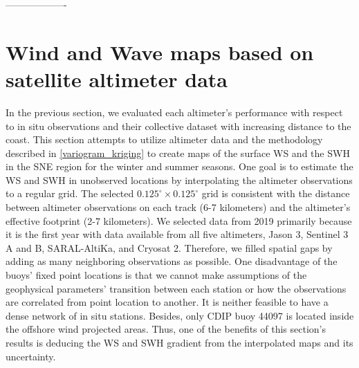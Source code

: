 -------------------


\section{Wind and Wave maps based on satellite altimeter data}\label{}

In the previous section, we evaluated each altimeter's performance with respect to in situ observations and their collective dataset with increasing distance to the coast. This section attempts to utilize altimeter data and the methodology described in \ref{variogram_kriging} to create maps of the surface WS and the SWH in the SNE region for the winter and summer seasons. One goal is to estimate the WS and SWH in unobserved locations by interpolating the altimeter observations to a regular grid. The selected $0.125^{\circ}\times0.125^{\circ}$ grid is consistent with the distance between altimeter observations on each track (6-7 kilometers) and the altimeter's effective footprint (2-7 kilometers).  We selected data from 2019 primarily because it is the first year with data available from all five altimeters, Jason 3, Sentinel 3 A and B, SARAL-AltiKa, and Cryosat 2. Therefore, we filled spatial gaps by adding as many neighboring observations as possible. One disadvantage of the buoys' fixed point locations is that we cannot make assumptions of the geophysical parameters' transition between each station or how the observations are correlated from point location to another. It is neither feasible to have a dense network of in situ stations. Besides, only CDIP buoy 44097 is located inside the offshore wind projected areas. Thus, one of the benefits of this section's results is deducing the WS and SWH gradient from the interpolated maps and its uncertainty.

